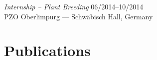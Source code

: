 \documentclass[margin,a4paper]{res}
\begin{document}
\begin{resume}


{\sl Internship -- Plant Breeding} \hfill 06/2014--10/2014 \\
PZO Oberlimpurg  --- Schwäbisch Hall, Germany



\section{Publications} %

\begin{etaremune}
\setlength\itemsep{0ex}


\end{etaremune}
\end{resume}
\end{document}
